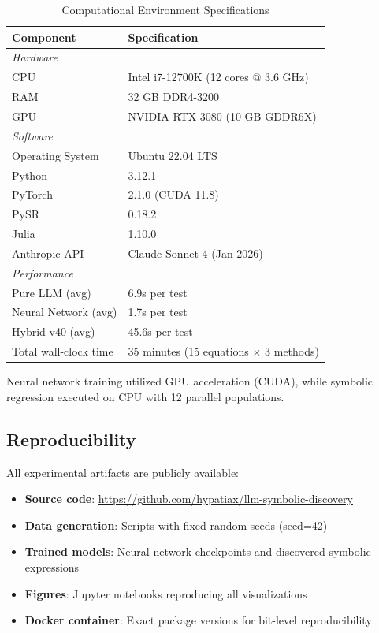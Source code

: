 \begin{table}[htbp]
\centering
\caption{Computational Environment Specifications}
\label{tab:environment}
\begin{tabular}{ll}
\toprule
\textbf{Component} & \textbf{Specification} \\
\midrule
\multicolumn{2}{l}{\textit{Hardware}} \\
CPU & Intel i7-12700K (12 cores @ 3.6 GHz) \\
RAM & 32 GB DDR4-3200 \\
GPU & NVIDIA RTX 3080 (10 GB GDDR6X) \\
\midrule
\multicolumn{2}{l}{\textit{Software}} \\
Operating System & Ubuntu 22.04 LTS \\
Python & 3.12.1 \\
PyTorch & 2.1.0 (CUDA 11.8) \\
PySR & 0.18.2 \\
Julia & 1.10.0 \\
Anthropic API & Claude Sonnet 4 (Jan 2026) \\
\midrule
\multicolumn{2}{l}{\textit{Performance}} \\
Pure LLM (avg) & 6.9s per test \\
Neural Network (avg) & 1.7s per test \\
Hybrid v40 (avg) & 45.6s per test \\
Total wall-clock time & 35 minutes (15 equations $\times$ 3 methods) \\
\bottomrule
\end{tabular}
\end{table}

Neural network training utilized GPU acceleration (CUDA), while symbolic regression executed on CPU with 12 parallel populations.

\subsection{Reproducibility}

All experimental artifacts are publicly available:

\begin{itemize}
    \item \textbf{Source code}: \url{https://github.com/hypatiax/llm-symbolic-discovery}
    \item \textbf{Data generation}: Scripts with fixed random seeds (seed=42)
    \item \textbf{Trained models}: Neural network checkpoints and discovered symbolic expressions
    \item \textbf{Figures}: Jupyter notebooks reproducing all visualizations
    \item \textbf{Docker container}: Exact package versions for bit-level reproducibility
\end{itemize}

